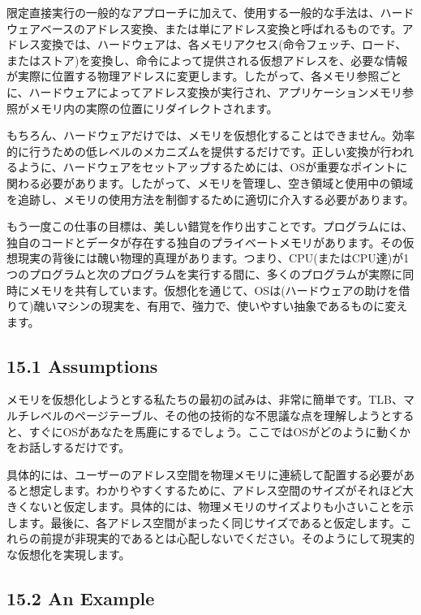 限定直接実行の一般的なアプローチに加えて、使用する一般的な手法は、ハードウェアベースのアドレス変換、または単にアドレス変換と呼ばれるものです。アドレス変換では、ハードウェアは、各メモリアクセス(命令フェッチ、ロード、またはストア)を変換し、命令によって提供される仮想アドレスを、必要な情報が実際に位置する物理アドレスに変更します。したがって、各メモリ参照ごとに、ハードウェアによってアドレス変換が実行され、アプリケーションメモリ参照がメモリ内の実際の位置にリダイレクトされます。

もちろん、ハードウェアだけでは、メモリを仮想化することはできません。効率的に行うための低レベルのメカニズムを提供するだけです。正しい変換が行われるように、ハードウェアをセットアップするためには、OSが重要なポイントに関わる必要があります。したがって、メモリを管理し、空き領域と使用中の領域を追跡し、メモリの使用方法を制御するために適切に介入する必要があります。

もう一度この仕事の目標は、美しい錯覚を作り出すことです。プログラムには、独自のコードとデータが存在する独自のプライベートメモリがあります。その仮想現実の背後には醜い物理的真理があります。つまり、CPU(またはCPU達)が1つのプログラムと次のプログラムを実行する間に、多くのプログラムが実際に同時にメモリを共有しています。仮想化を通じて、OSは(ハードウェアの助けを借りて)醜いマシンの現実を、有用で、強力で、使いやすい抽象であるものに変えます。

\hypertarget{assumptions}{%
\subsection*{15.1 Assumptions}\label{assumptions}}

メモリを仮想化しようとする私たちの最初の試みは、非常に簡単です。TLB、マルチレベルのページテーブル、その他の技術的な不思議な点を理解しようとすると、すぐにOSがあなたを馬鹿にするでしょう。ここではOSがどのように動くかをお話しするだけです。

具体的には、ユーザーのアドレス空間を物理メモリに連続して配置する必要があると想定します。わかりやすくするために、アドレス空間のサイズがそれほど大きくないと仮定します。具体的には、物理メモリのサイズよりも小さいことを示します。最後に、各アドレス空間がまったく同じサイズであると仮定します。これらの前提が非現実的であるとは心配しないでください。そのようにして現実的な仮想化を実現します。

\hypertarget{an-example-1}{%
\subsection*{15.2 An Example}\label{an-example-1}}

